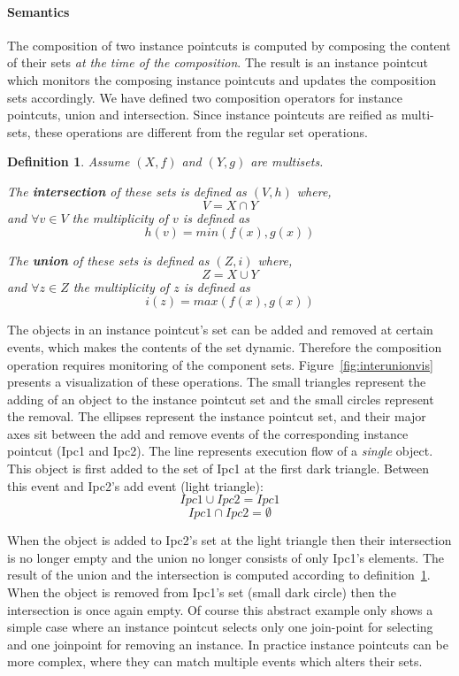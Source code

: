 \documentclass{acm_proc_article-sp}
\newtheorem{mydef}{Definition}
\begin{document}
\paragraph{Semantics}
The composition of two instance pointcuts is computed by composing the content of their sets \emph{at the time of the composition}. The result is an instance pointcut which monitors the composing instance pointcuts and updates the composition sets accordingly. We have defined two composition operators for instance pointcuts, union and intersection. Since instance pointcuts are reified as multi-sets, these operations are different from the regular set operations.

\begin{mydef}
\label{def:inun}
Assume $(X, f)$ and $(Y, g)$ are multisets. 

The \textbf{intersection} of these sets is defined as $(V, h)$ where, 
\[V = X \cap Y\] and
$\forall v \in V$ the multiplicity of $v$ is defined as \[h(v) =  min(f(x),g(x))\]

The \textbf{union} of these sets is defined as $(Z, i)$ where, 
\[Z = X \cup Y\] and
$\forall z \in Z$ the multiplicity of $z$ is defined as \[i(z) =  max(f(x),g(x))\]
\end{mydef}

The objects in an instance pointcut's set can be added and removed at certain events, which makes the contents of the set dynamic. Therefore the composition operation requires monitoring of the component sets.  Figure~\ref{fig:interunionvis} presents a visualization of these operations. The small triangles represent the adding of an object to the instance pointcut set and the small circles represent the removal. The ellipses represent the instance pointcut set, and their major axes sit between the add and remove events of the corresponding instance pointcut (Ipc1 and Ipc2). The line represents execution flow of a \emph{single} object. This object is first added to the set of Ipc1 at the first dark triangle. Between this event and Ipc2's add event (light triangle):
\[Ipc1 \cup  Ipc2 = Ipc1\]
\[Ipc1 \cap Ipc2 = \emptyset\]

When the object is added to Ipc2's set at the light triangle then their intersection is no longer empty and the union no longer consists of only Ipc1's elements. The result of the union and the intersection is computed according to definition~\ref{def:inun}. When the object is removed from Ipc1's set (small dark circle) then the intersection is once again empty. Of course this abstract example only shows a simple case where an instance pointcut selects only one join-point for selecting and one joinpoint for removing an instance. In practice instance pointcuts can be more complex, where they can match multiple events which alters their sets. 
\end{document}
